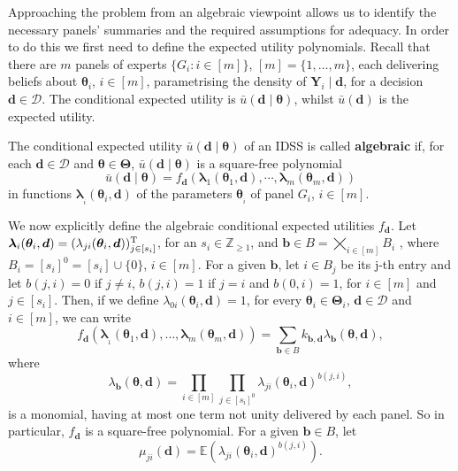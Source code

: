Approaching the problem from an algebraic viewpoint allows us to identify the necessary panels' summaries and the required assumptions for adequacy. In order to do this we first need to define the expected utility polynomials. Recall that there are $m $ panels of experts $\{G_i:i\in[m]\}$, $[m]=\{1,\dots,m\}$, each delivering beliefs about $\bm{\theta}_i$, $i\in[m]$, parametrising the density of $\bm{Y}_i\;|\;\bm{d}$, for a decision $\bm{d}\in\bm{\mathcal{D}}$. The conditional expected utility is $\bar{u}(\bm{d}\;|\;\bm{\theta})$, whilst $\bar{u}(\bm{d})$ is the expected utility.

\begin{definition}
The conditional expected utility $\bar{u}(\bm{d}\;|\;\bm{\theta})$ of an IDSS is called \textbf{algebraic} if, for each $\bm{d}\in \bm{\mathcal{D}}$ and $\bm{\theta} \in \bm{\Theta} $, $\bar{u}(\bm{d}\;|\;\bm{\theta})$ is a square-free polynomial 
\[
\bar{u}(\bm{d}\;|\;\bm{\theta})=f_{\bm{d}}\left( \bm{\lambda}_{1}(\bm{\theta}_{1},\bm{d}),\cdots,\bm{\lambda}_m(\bm{\theta }_{m},\bm{d})\right) 
\]
 in functions $\bm{\lambda }_{_{i}}(\bm{\theta }_{i},\bm{d})$ of the parameters $\bm{\theta }_{_{i}}$ of panel $G_{i}$, $i\in[m]$.
\end{definition}

We now explicitly define the algebraic conditional expected utilities $f_{\bm{d}} $. Let $\bm{\lambda}_i(\bm{\theta}_i,\bm{d})=(\lambda _{ji}(\bm{\theta }_{i},\bm{d}))^{\textnormal{T}}_{j\in[s_i]}$, for an $s_i\in\mathbb{Z}_{\geq 1}$, and $\bm{b}\in B=\bigtimes_{i\in[m]}B_{i}$ , where $B_{i}=[s_i]^0=[s_i]\cup \{0\}$, $i\in[m]$. For a given $\bm{b}$, let $i\in B_j$ be its j-th entry and let $b(j,i)=0$ if $j\neq i$, $b(j,i)=1$ if $j=i$ and $b(0,i)=1$, for $i\in[m]$ and $j\in[s_i]$. Then, if we define $\lambda_{0i}(\bm{\theta}_i,\bm{d})=1$, for every $\bm{\theta}_i\in \bm{\Theta}_i$, $\bm{d}\in\bm{\mathcal{D}}$ and $i\in[m]$, we can write 
\begin{equation}
f_{\bm{d}}\left( \bm{\lambda }_{_{1}}(\bm{\theta }_{1},\bm{d}),\dots,\bm{\lambda }_{m}(\bm{\theta }_{m},\bm{d})\right)  = \sum_{\bm{b}\in B}k_{\bm{b},\bm{d}}\lambda _{\bm{b}}(\bm{ \theta },\bm{d}),  \label{algebraic utility} \end{equation}
where
\begin{equation*}
 \lambda _{\bm{b}}(\bm{\theta },\bm{d}) = \prod_{i\in[m]}\prod_{j\in[s_i]^0}\lambda_{ji}(\bm{\theta }_{i},\bm{d})^{b(j,i)},  \label{eq:aceu2}
\end{equation*}
is a monomial, having at most one term not unity delivered by each panel. So in particular, $f_{\bm{d}} $ is a square-free polynomial. For a given $\bm{b}\in B$, let
\begin{equation*}
\mu _{ji}(\bm{d})= \mathbb{E}\left( \lambda_{ji}(\bm{\theta }_{i},\bm{d})^{b(j,i)}\right). 
\end{equation*}

